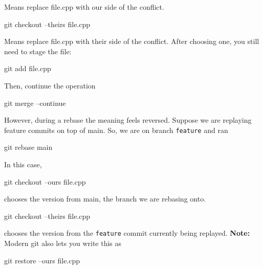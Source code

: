 \documentclass{report}
\begin{document}
\begin{itemize}
\begin{itemize}
                    Means replace file.cpp with our side of the conflict.
                    \bigbreak \noindent 
                    \begin{bashcode}
                        git checkout --theirs file.cpp
                    \end{bashcode}
                    \bigbreak \noindent 
                    Means replace file.cpp with their side of the conflict. After choosing one, you still need to stage the file:
                    \bigbreak \noindent 
                    \begin{bashcode}
                        git add file.cpp
                    \end{bashcode}
                    \bigbreak \noindent 
                    Then, continue the operation
                    \bigbreak \noindent 
                    \begin{bashcode}
                        git merge --continue
                    \end{bashcode}
                    \bigbreak \noindent 
                    However, during a rebase the meaning feels reversed. Suppose we are replaying feature commits on top of main. So, we are on branch \texttt{feature} and ran
                    \bigbreak \noindent 
                    \begin{bashcode}
                        git rebase main
                    \end{bashcode}
                    \bigbreak \noindent 
                    In this case, 
                    \bigbreak \noindent 
                    \begin{bashcode}
                        git checkout --ours file.cpp
                    \end{bashcode}
                    \bigbreak \noindent 
                    chooses the version from main, the branch we are rebasing onto.
                    \bigbreak \noindent 
                    \begin{bashcode}
                        git checkout --theirs file.cpp
                    \end{bashcode}
                    \bigbreak \noindent 
                    chooses the version from the \texttt{feature} commit currently being replayed.
                    \bigbreak \noindent 
                    \textbf{Note:} Modern git also lets you write this as
                    \bigbreak \noindent 
                    \begin{bashcode}
                        git restore --ours file.cpp

\end{bashcode}
\end{itemize}
\end{itemize}
\end{document}
